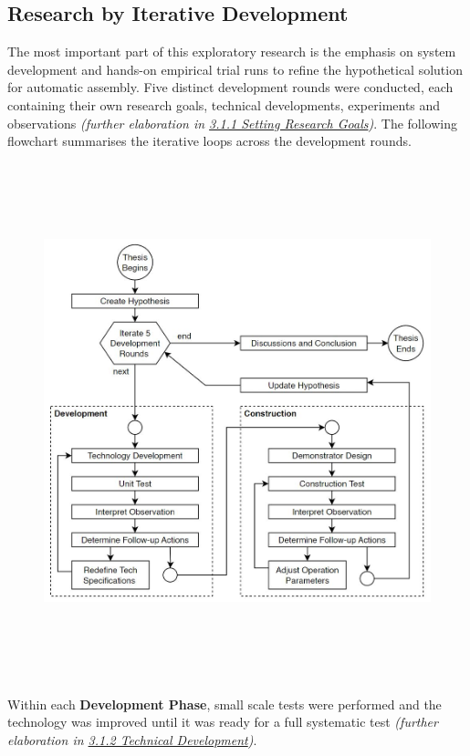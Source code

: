 \documentclass[11pt]{book}
\begin{document}
\subsection{Research by Iterative Development}

The most important part of this exploratory research is the emphasis on system development and hands-on empirical trial runs to refine the hypothetical solution for automatic assembly. Five distinct development rounds were conducted, each containing their own research goals, technical developments, experiments and observations \textit{(further elaboration in \uline{3.1.1 Setting Research Goals})}. The following flowchart summarises the iterative loops across the development rounds. 

\begin{figure}[H]
\includegraphics[width=15.92cm,height=14.96cm]{./images/image8.jpg}
\end{figure}


Within each \textbf{Development Phase}, small scale tests were performed and the technology was improved until it was ready for a full systematic test \textit{(further elaboration in \uline{3.1.2 Technical Development})}. 
\end{document}
